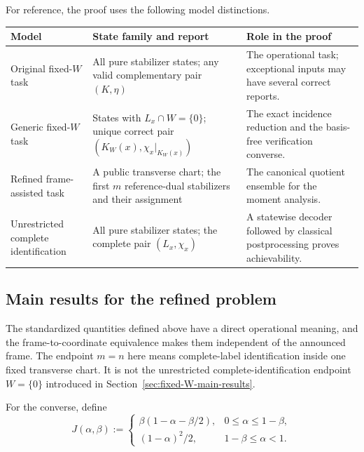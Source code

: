 \documentclass[11pt]{article}
\newcommand{\1}{\mathbf 1}
\theoremstyle{plain}
\theoremstyle{definition}
\theoremstyle{remark}
\begin{document}
For reference, the proof uses the following model distinctions.
\begin{center}
\small
\renewcommand{\arraystretch}{1.15}
\begin{tabularx}{\textwidth}{@{}>{\raggedright\arraybackslash}p{}YY@{}}
\toprule
Model & State family and report & Role in the proof\\
\midrule
Original fixed-$W$ task
& All pure stabilizer states; any valid complementary pair $(K,\eta)$
& The operational task; exceptional inputs may have several correct reports.\\
Generic fixed-$W$ task
& States with $L_x\cap W=\{0\}$; unique correct pair $(K_W(x),\chi_x|_{K_W(x)})$
& The exact incidence reduction and the basis-free verification converse.\\
Refined frame-assisted task
& A public transverse chart; the first $m$ reference-dual stabilizers and their assignment
& The canonical quotient ensemble for the moment analysis.\\
Unrestricted complete identification
& All pure stabilizer states; the complete pair $(L_x,\chi_x)$
& A statewise decoder followed by classical postprocessing proves achievability.\\
\bottomrule
\end{tabularx}
\end{center}

\subsection{Main results for the refined problem}
\label{subsec:main-results-operational-tasks}
\label{subsec:rate-functions}

The standardized quantities defined above have a direct operational meaning,
and the frame-to-coordinate equivalence makes them independent of the
announced frame.  The endpoint $m=n$ here means complete-label identification inside one
fixed transverse chart.  It is not the unrestricted complete-identification
endpoint $W=\{0\}$ introduced in Section~\ref{sec:fixed-W-main-results}.

For the converse, define
\begin{equation}
 J(\alpha,\beta):=
 \begin{cases}
 \beta(1-\alpha-\beta/2),&0\le\alpha\le1-\beta,\\
 (1-\alpha)^2/2,&1-\beta\le\alpha<1.
 \end{cases}
 \label{eq:main-results-J}
\end{equation}
\end{document}
